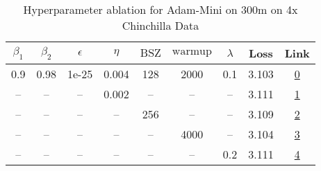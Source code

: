 \begin{table}[H]
\centering
\caption{Hyperparameter ablation for Adam-Mini on 300m on 4x Chinchilla Data}
\label{tab:ablation_adam-mini_300m_4}
\begin{tabular}{ccccccccc}
\toprule
$\beta_1$ & $\beta_2$ & $\epsilon$ & $\eta$ & $\mathrm{BSZ}$ & $\mathrm{warmup}$ & $\lambda$ & Loss & Link \\
\midrule
0.9 & 0.98 & 1e-25 & 0.004 & 128 & 2000 & 0.1 & 3.103 & \href{https://wandb.ai/stanford-mercury/optimizer-scaling/runs/sweep-300m-24B-mini09d394lr0.004-wd0.1-minlr0-warmup2000-b10.9-b-4e8de7}{0} \\
\midrule
-- & -- & -- & 0.002 & -- & -- & -- & 3.111 & \href{https://wandb.ai/stanford-mercury/optimizer-scaling/runs/sweep-300m-24B-mini5d38a2lr0.002-wd0.1-minlr0-warmup2000-b10.9-b-951b01}{1} \\
-- & -- & -- & -- & 256 & -- & -- & 3.109 & \href{https://wandb.ai/stanford-mercury/optimizer-scaling/runs/sweep-300m-24B-minid571a7lr0.004-wd0.1-minlr0-warmup2000-b10.9-b-e475d2}{2} \\
-- & -- & -- & -- & -- & 4000 & -- & 3.104 & \href{https://wandb.ai/stanford-mercury/optimizer-scaling/runs/sweep-300m-24B-mini0831d8lr0.004-wd0.1-minlr0-warmup4000-b10.9-b-41a654}{3} \\
-- & -- & -- & -- & -- & -- & 0.2 & 3.111 & \href{https://wandb.ai/stanford-mercury/optimizer-scaling/runs/sweep-300m-24B-mini891741lr0.004-wd0.2-minlr0-warmup2000-b10.9-b-a97787}{4} \\
\bottomrule
\end{tabular}
\end{table}

